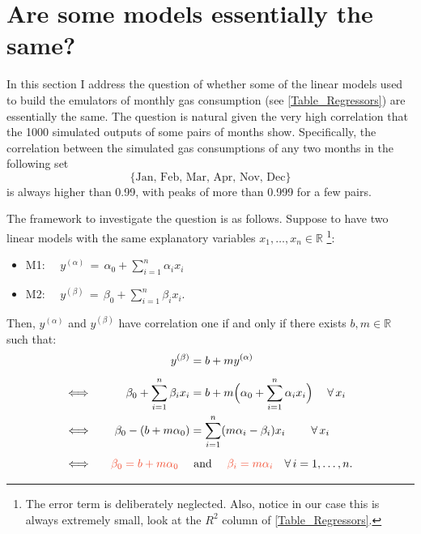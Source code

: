 \documentclass[a4paper, 12pt]{article}
\newcommand{\R}{\mathbb{R}}
\newcommand{\ya}{y^{(\alpha)}}
\newcommand{\yb}{y^{(\beta)}}
\begin{document}
\newpage

\section{Are some models essentially the same?}

In this section I address the question of whether some of the linear models used to build the emulators of monthly gas consumption (see \autoref{Table_Regressors}) are essentially the same. The question is natural given the very high correlation that the 1000 simulated outputs of some pairs of months show. Specifically, the correlation between the simulated gas consumptions of any two months in the following set
\begin{equation}\label{months}
\{ \text{Jan, Feb, Mar, Apr, Nov, Dec} \}
\end{equation}
is always higher than 0.99, with peaks of more than 0.999 for a few pairs. 

The framework to investigate the question is as follows. Suppose to have two linear models with the same explanatory variables $x_1, \dots, x_n \in \R$
\footnote{The error term is deliberately neglected. Also, notice in our case this is always extremely small, look at the $R^2$ column of \autoref{Table_Regressors}.}:\vspace{-1ex}
\begin{itemize}
\renewcommand\labelitemi{$\blacktriangleright$}
\item M1: $\quad\displaystyle \ya \,=\, \alpha_0 + \sum_{i=1}^n \alpha_i x_i$
\item M2: $\quad\displaystyle \yb \,=\, \beta_0 + \sum_{i=1}^n \beta_i x_i$. 
\end{itemize}
Then, $\ya$ and $\yb$ have correlation one if and only if there exists $b,m \in \R$ such that:
\begin{align}
 \yb &= b + m \ya  \label{corr1}   \\[1ex]
\Longleftrightarrow \qquad \quad
      \beta_0 + \sum_{i=1}^n \beta_i x_i &= b+ m \Big( \alpha_0 + \sum_{i=1}^n \alpha_i x_i \Big) \quad\; \forall \,x_i\nonumber\\
\Longleftrightarrow \qquad 
      \beta_0 - (b+ m \alpha_0) &=  \sum_{i=1}^n (m\alpha_i - \beta_i) x_i \qquad\; \forall \,x_i \nonumber\\[1ex]
\Longleftrightarrow \quad\;\:\,
     \textcolor{RedOrange}{\beta_0 = b+ m \alpha_0} \quad &\text{ and } \quad 
     \textcolor{RedOrange}{\beta_i=m\alpha_i} \quad\forall \,i=1, \dots,n. \label{ya_yb}
\end{align}
\end{document}
